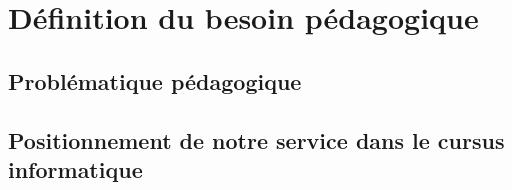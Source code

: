 

\section{Définition du besoin pédagogique}

\subsection{Problématique pédagogique}

\subsection{Positionnement de notre service dans le cursus informatique}
